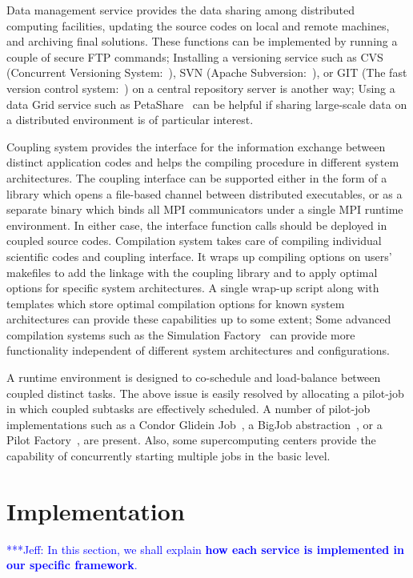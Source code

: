 \documentclass[10pt,conference]{IEEEtran}
\newcommand{\skonote}[1]{ {\textcolor{blue} { ***Jeff: #1 }}}
\newcommand{\skonote}[1]{}
\begin{document}
Data management service provides the data sharing among distributed computing facilities, updating the source codes on local and remote machines, and archiving final solutions. These functions can be implemented by running a couple of secure FTP commands; Installing a versioning service such as CVS (Concurrent Versioning System:~\cite{CVS}), SVN (Apache Subversion:~\cite{SVN}), or GIT (The fast version control system:~\cite{GIT}) on a central repository server is another way; Using a data Grid service such as PetaShare~\cite{PetaShare} can be helpful if sharing large-scale data on a distributed environment is of particular interest.

Coupling system provides the interface for the information exchange between distinct application codes and helps the compiling procedure in different system architectures. The coupling interface can be supported either in the form of a library which opens a file-based channel between distributed executables, or as a separate binary which binds all MPI communicators under a single MPI runtime environment. In either case, the interface function calls should be deployed in coupled source codes. Compilation system takes care of compiling individual scientific codes and coupling interface. It wraps up compiling options on users' makefiles to add the linkage with the coupling library and to apply optimal options for specific system architectures. A single wrap-up script along with templates which store optimal compilation options for known system architectures can provide these capabilities up to some extent; Some advanced compilation systems such as the Simulation Factory~\cite{SimFactory} can provide more functionality independent of different system architectures and configurations.

A runtime environment is designed to co-schedule and load-balance between coupled distinct tasks. The above issue is easily resolved by allocating a pilot-job in which coupled subtasks are effectively scheduled. A number of pilot-job implementations such as a Condor Glidein Job~\cite{Condor}, a BigJob abstraction~\cite{repex_ptrsa}, or a Pilot Factory~\cite{PilotFactory}, are present. Also, some supercomputing centers provide the capability of concurrently starting multiple jobs in the basic level.

\section{Implementation}
\label{sec:implementation}
\skonote{In this section, we shall explain \textbf{how each service is implemented in our specific framework}.}
\end{document}

